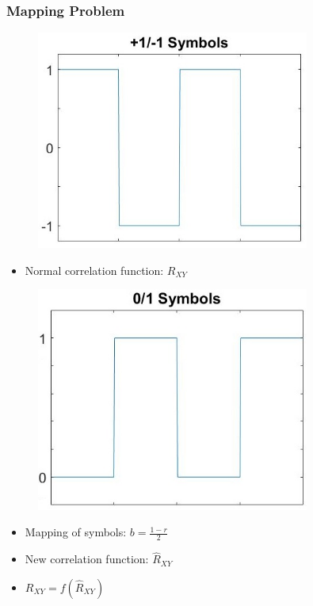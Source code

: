\documentclass{beamer}
\begin{document}
	\begin{frame}\frametitle{Mapping Problem}

		\noindent
		\begin{minipage}{.5\linewidth}
			\begin{figure}
				\centering
				\includegraphics[width=0.8\textwidth]{mapping_radio_symbols.jpg}
			\end{figure}

			\begin{itemize}
				\item Normal correlation function: $R_{XY}$
			\end{itemize}
			
		\end{minipage}%
		\begin{minipage}{.5\linewidth}
			\begin{figure}
				\centering
				\includegraphics[width=0.8\textwidth]{mapping_binary_symbols.jpg}
			\end{figure}

			\begin{itemize}
				\item Mapping of symbols: $b = \frac{1 - r}{2}$
				\item New correlation function: $\hat{R}_{XY}$
				\item $R_{XY} = f(\hat{R}_{XY})$    %
			\end{itemize}


		\end{minipage}

	\end{frame}
\end{document}
